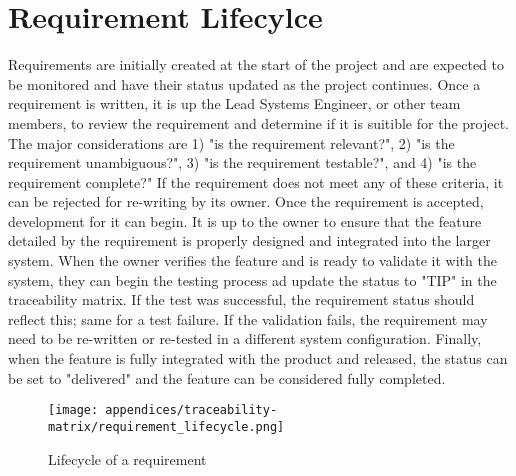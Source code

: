 \section{Requirement Lifecylce}
Requirements are initially created at the start of the project and are expected to be monitored and have their status updated as the project continues.
Once a requirement is written, it is up the Lead Systems Engineer, or other team members, to review the requirement and determine if it is suitible for the project.
The major considerations are 1) "is the requirement relevant?", 2) "is the requirement unambiguous?", 3) "is the requirement testable?", and 4) "is the requirement complete?"
If the requirement does not meet any of these criteria, it can be rejected for re-writing by its owner.
Once the requirement is accepted, development for it can begin.
It is up to the owner to ensure that the feature detailed by the requirement is properly designed and integrated into the larger system.
When the owner verifies the feature and is ready to validate it with the system, they can begin the testing process ad update the status to "TIP" in the traceability matrix.
If the test was successful, the requirement status should reflect this; same for a test failure.
If the validation fails, the requirement may need to be re-written or re-tested in a different system configuration.
Finally, when the feature is fully integrated with the product and released, the status can be set to "delivered" and the feature can be considered fully completed.

\begin{figure}
    \centering
    \caption{Lifecycle of a requirement}
    \texttt{[image: appendices/traceability-matrix/requirement\_lifecycle.png]}
    \label{fig:requirement_lifecycle}
\end{figure}

